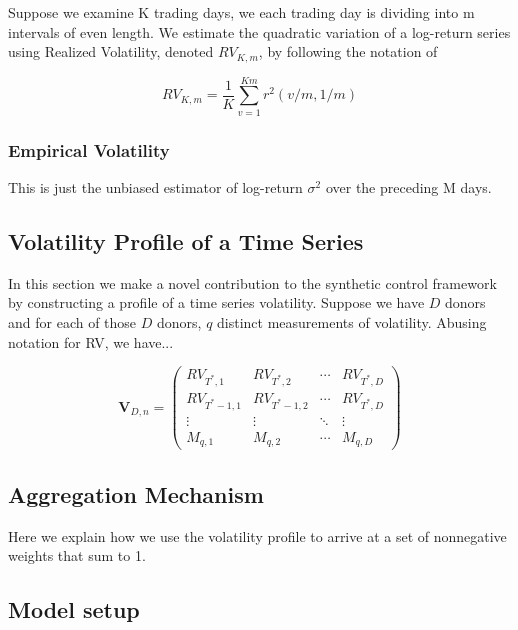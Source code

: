 \documentclass[11pt]{article}
\theoremstyle{definition}
\begin{document}
Suppose we examine K trading days, we each trading day is dividing into m intervals of even length.  We estimate the quadratic variation of a log-return series using Realized Volatility, denoted $RV_{K,m}$, by following the notation of  \citet{andersen2008realized} 

$$RV_{K,m} = \frac{1}{K}\sum^{Km}_{v=1}r^{2}(v/m,1/m)$$

\subsubsection{Empirical Volatility}

This is just the unbiased estimator of log-return $\sigma^{2}$ over the preceding M days.

\subsection{Volatility Profile of a Time Series}
\label{Volatility Profile of a Time Series}

In this section we make a novel contribution to the synthetic control framework by constructing a profile of a time series volatility.  Suppose we have $D$ donors and for each of those $D$ donors, $q$ distinct measurements of volatility.  Abusing notation for RV, we have...

\begin{equation*}
\textbf{V}_{D,n} = 
\begin{pmatrix}
RV_{T^{*},1} & RV_{T^{*},2}  & \cdots & RV_{T^{*},D}  \\
RV_{T^{*}-1,1}  & RV_{T^{*}-1,2}  & \cdots & RV_{T^{*},D}  \\
\vdots  & \vdots  & \ddots & \vdots  \\
M_{q,1} & M_{q,2} & \cdots & M_{q,D} 
\end{pmatrix}
\end{equation*}


\subsection{Aggregation Mechanism}
\label{Aggregation Mechanism}

Here we explain how we use the volatility profile to arrive at a set of nonnegative weights that sum to 1.

\subsection{Model setup}
\label{modelsetup}
\end{document}

